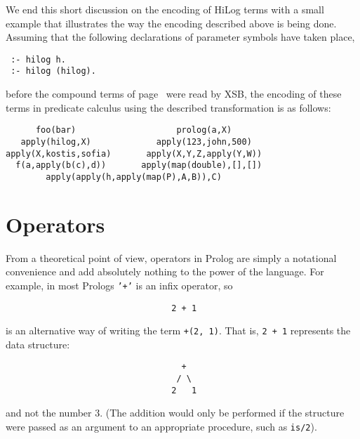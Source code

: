 We end this short discussion on the encoding of HiLog terms with a small
example that illustrates the way the encoding described above is being done.
Assuming that the following declarations of parameter symbols have taken place,
\begin{center}
\begin{minipage}{1.6in}
\begin{verbatim}
 :- hilog h.
 :- hilog (hilog).
\end{verbatim}
\end{minipage}
\end{center}
before the compound terms of page~\pageref{some_compound_terms} were
read by XSB, the encoding of these terms in predicate calculus using
the described transformation is as follows:
\begin{center}
\begin{minipage}{4.5in}
\begin{verbatim}
      foo(bar)                    prolog(a,X) 
   apply(hilog,X)             apply(123,john,500)
apply(X,kostis,sofia)       apply(X,Y,Z,apply(Y,W))
  f(a,apply(b(c),d))       apply(map(double),[],[])  
        apply(apply(h,apply(map(P),A,B)),C)
\end{verbatim}
\end{minipage}
\end{center}


\section{Operators} \label{Operators}
From a theoretical point of view, operators in Prolog are simply a notational
convenience and add absolutely nothing to the power of the language.
For example, in most Prologs {\tt '+'} is an infix operator, so
\begin{verbatim}
                                 2 + 1
\end{verbatim}
is an alternative way of writing the term {\tt +(2, 1)}.  That is, {\tt 2 + 1}
represents the data structure:
\begin{verbatim}
                                   +
                                  / \
                                 2   1
\end{verbatim}
and not the number 3.  (The addition would only be performed if the structure
were passed as an argument to an appropriate procedure, such as {\tt is/2}).

